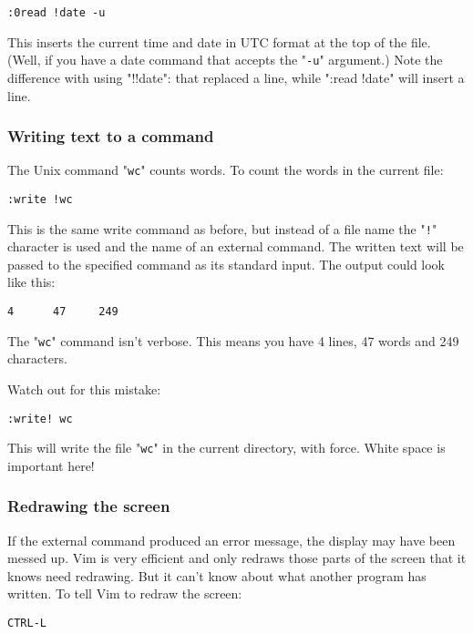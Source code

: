 \begin{Verbatim}[samepage=true]
 :0read !date -u
\end{Verbatim}

This inserts the current time and date in UTC format at the top of the file.
(Well, if you have a date command that accepts the "\texttt{-u}" argument.) 
Note the difference with using "!!date": that replaced a line, while ":read !date" will insert a line.
\subsubsection{Writing text to a command}
The Unix command "\texttt{wc}" counts words.
To count the words in the current file:

\begin{Verbatim}[samepage=true]
 :write !wc
\end{Verbatim}

This is the same write command as before, but instead of a file name the "\texttt{!}" character is used and the name of an external command.
The written text will be passed to the specified command as its standard input.
The output could look like this:

\begin{Verbatim}[samepage=true]
       4      47     249 
\end{Verbatim}

The "\texttt{wc}" command isn't verbose.
This means you have 4 lines, 47 words and 249 characters.

Watch out for this mistake:

\begin{Verbatim}[samepage=true]
 :write! wc
\end{Verbatim}

This will write the file "\texttt{wc}" in the current directory, with force.
White space is important here!

\subsubsection{Redrawing the screen}
If the external command produced an error message, the display may have been messed up.
Vim is very efficient and only redraws those parts of the screen that it knows need redrawing.
But it can't know about what another program has written.
To tell Vim to redraw the screen:

\begin{Verbatim}[samepage=true]
 CTRL-L
\end{Verbatim}
\clearpage

